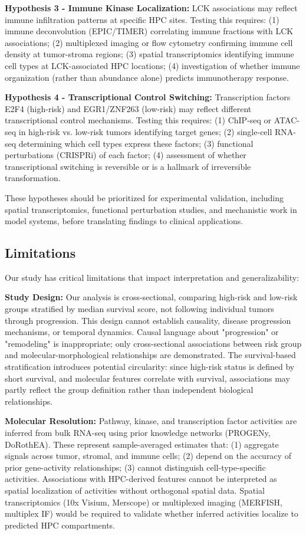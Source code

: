 \documentclass[pdflatex,article,12pt]{article}
\begin{document}
\textbf{Hypothesis 3 - Immune Kinase Localization:} LCK associations may reflect immune infiltration patterns at specific HPC sites. Testing this requires: (1) immune deconvolution (EPIC/TIMER) correlating immune fractions with LCK associations; (2) multiplexed imaging or flow cytometry confirming immune cell density at tumor-stroma regions; (3) spatial transcriptomics identifying immune cell types at LCK-associated HPC locations; (4) investigation of whether immune organization (rather than abundance alone) predicts immunotherapy response.

\textbf{Hypothesis 4 - Transcriptional Control Switching:} Transcription factors E2F4 (high-risk) and EGR1/ZNF263 (low-risk) may reflect different transcriptional control mechanisms. Testing this requires: (1) ChIP-seq or ATAC-seq in high-risk vs. low-risk tumors identifying target genes; (2) single-cell RNA-seq determining which cell types express these factors; (3) functional perturbations (CRISPRi) of each factor; (4) assessment of whether transcriptional switching is reversible or is a hallmark of irreversible transformation.

These hypotheses should be prioritized for experimental validation, including spatial transcriptomics, functional perturbation studies, and mechanistic work in model systems, before translating findings to clinical applications.

\subsection{Limitations}

Our study has critical limitations that impact interpretation and generalizability:

\textbf{Study Design:} Our analysis is cross-sectional, comparing high-risk and low-risk groups stratified by median survival score, not following individual tumors through progression. This design cannot establish causality, disease progression mechanisms, or temporal dynamics. Causal language about "progression" or "remodeling" is inappropriate; only cross-sectional associations between risk group and molecular-morphological relationships are demonstrated. The survival-based stratification introduces potential circularity: since high-risk status is defined by short survival, and molecular features correlate with survival, associations may partly reflect the group definition rather than independent biological relationships.

\textbf{Molecular Resolution:} Pathway, kinase, and transcription factor activities are inferred from bulk RNA-seq using prior knowledge networks (PROGENy, DoRothEA). These represent sample-averaged estimates that: (1) aggregate signals across tumor, stromal, and immune cells; (2) depend on the accuracy of prior gene-activity relationships; (3) cannot distinguish cell-type-specific activities. Associations with HPC-derived features cannot be interpreted as spatial localization of activities without orthogonal spatial data. Spatial transcriptomics (10x Visium, Merscope) or multiplexed imaging (MERFISH, multiplex IF) would be required to validate whether inferred activities localize to predicted HPC compartments.
\end{document}
